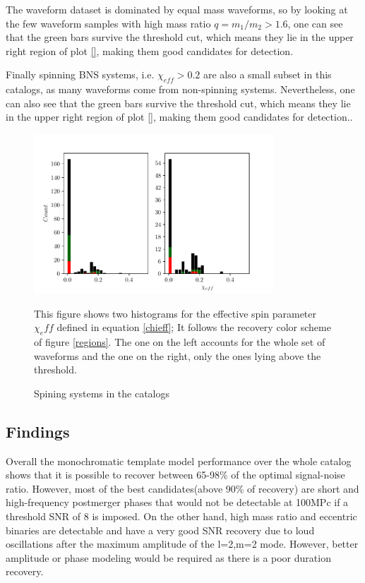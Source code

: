 The waveform dataset is dominated by equal mass waveforms, so by looking at the few waveform samples with  high mass ratio $q=m_1/m_2>1.6$, one can see that the green bars survive the threshold cut, which means they lie in the upper right region of plot \ref{}, making them good candidates for detection.
 

\newpage

Finally spinning BNS systems, i.e. $\chi_{eff}>0.2$ are also a small subset in this catalogs, as many waveforms come from non-spinning systems. Nevertheless, one can also see that the green bars survive the threshold cut, which means they lie in the upper right region of plot \ref{}, making them good candidates for detection..

\begin{figure}[hbt!]
\begin{center}
\includegraphics[width=0.8\textwidth, angle=0]{images/Data_analysis/results/alpha_chihist.pdf}
\caption{Spining systems in the catalogs}
\label{achihist}
\end{center}
This figure shows two histograms for the effective spin parameter $\chi_eff$ defined in equation \ref{chieff}; It follows the recovery color scheme of figure \ref{regions}. The one on the left accounts for the whole set of waveforms and the one on the right, only the ones lying above the threshold.
\end{figure}

\FloatBarrier

\subsection*{Findings}

Overall the monochromatic template model performance over the whole catalog shows that it is possible to recover between 65-98\% of the optimal signal-noise ratio. However, most of the best candidates(above 90\% of recovery) are short and high-frequency postmerger phases that would not be detectable at 100MPc if a threshold SNR of 8 is imposed. On the other hand, high mass ratio and eccentric binaries are detectable and have a very good SNR recovery due to loud oscillations after the maximum amplitude of the l=2,m=2 mode. However, better amplitude or phase modeling would be required as there is a poor duration recovery.

